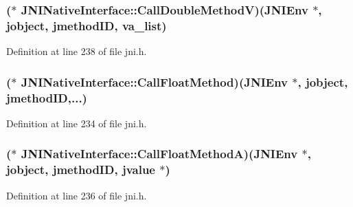 \hypertarget{struct_j_n_i_native_interface_aecce3122a83beb6ff70cc4f80b6e44a9}{
\subsubsection[{Call\-Double\-Method\-V}]{($\ast$ J\-N\-I\-Native\-Interface\-::\-Call\-Double\-Method\-V)({\bf J\-N\-I\-Env} $\ast$, {\bf jobject}, {\bf jmethod\-I\-D}, va\-\_\-list)}}\label{struct_j_n_i_native_interface_aecce3122a83beb6ff70cc4f80b6e44a9}


Definition at line 238 of file jni.\-h.

\hypertarget{struct_j_n_i_native_interface_a6edc572dae0cbc049c867175c0a2617d}{
\subsubsection[{Call\-Float\-Method}]{($\ast$ J\-N\-I\-Native\-Interface\-::\-Call\-Float\-Method)({\bf J\-N\-I\-Env} $\ast$, {\bf jobject}, {\bf jmethod\-I\-D},...)}}\label{struct_j_n_i_native_interface_a6edc572dae0cbc049c867175c0a2617d}


Definition at line 234 of file jni.\-h.

\hypertarget{struct_j_n_i_native_interface_a438a23e3692badf13b026c0dce70be03}{
\subsubsection[{Call\-Float\-Method\-A}]{($\ast$ J\-N\-I\-Native\-Interface\-::\-Call\-Float\-Method\-A)({\bf J\-N\-I\-Env} $\ast$, {\bf jobject}, {\bf jmethod\-I\-D}, {\bf jvalue} $\ast$)}}\label{struct_j_n_i_native_interface_a438a23e3692badf13b026c0dce70be03}


Definition at line 236 of file jni.\-h.

